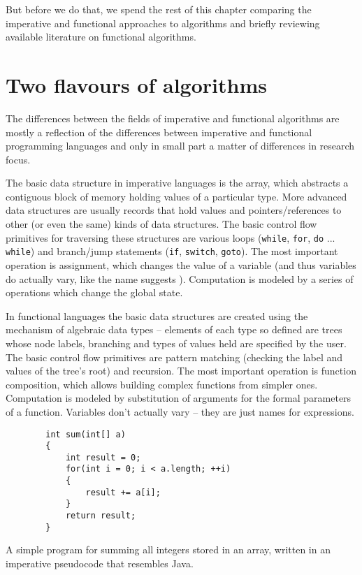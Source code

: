 \documentclass[declaration,mgr,english,shortabstract]{iithesis}
\newcommand{\m}[1]{\texttt{#1}}
\begin{document}
But before we do that, we spend the rest of this chapter comparing the imperative and functional approaches to algorithms and briefly reviewing available literature on functional algorithms.

\section{Two flavours of algorithms} \label{impfun}

The differences between the fields of imperative and functional algorithms are mostly a reflection of the differences between imperative and functional programming languages and only in small part a matter of differences in research focus.

The basic data structure in imperative languages is the array, which abstracts a contiguous block of memory holding values of a particular type. More advanced data structures are usually records that hold values and pointers/references to other (or even the same) kinds of data structures. The basic control flow primitives for traversing these structures are various loops (\m{while}, \m{for}, \m{do} ... \m{while}) and branch/jump statements (\m{if}, \m{switch}, \m{goto}). The most important operation is assignment, which changes the value of a variable (and thus variables do actually vary, like the name suggests \cite{WordsMatter}). Computation is modeled by a series of operations which change the global state.

In functional languages the basic data structures are created using the mechanism of algebraic data types -- elements of each type so defined are trees whose node labels, branching and types of values held are specified by the user. The basic control flow primitives are pattern matching (checking the label and values of the tree's root) and recursion. The most important operation is function composition, which allows building complex functions from simpler ones. Computation is modeled by substitution of arguments for the formal parameters of a function. Variables don't actually vary -- they are just names for expressions. \cite{WordsMatter}

\begin{listing}[H]
    \begin{verbatim}
        int sum(int[] a)
        {
            int result = 0;
            for(int i = 0; i < a.length; ++i)
            {
                result += a[i];
            }
            return result;
        }
    \end{verbatim}
    \caption{A simple program for summing all integers stored in an array, written in an imperative pseudocode that resembles Java.}
\end{listing}
\end{document}
